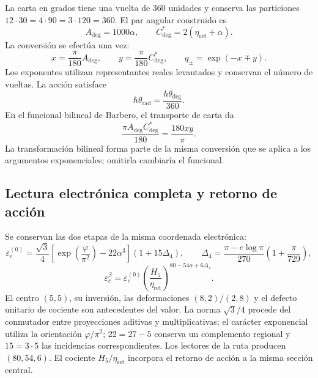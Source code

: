 La carta en grados tiene una vuelta de $360$ unidades y conserva las
particiones $12\cdot30=4\cdot90=3\cdot120=360$. El par angular construido es
\begin{equation}
 A_{\deg}=1000\alpha,
 \qquad C^*_{\deg}=2(\eta_{\mathrm{ret}}+\alpha).
 \label{md:compos:par-angular}
\end{equation}
La conversión se efectúa una vez:
\begin{equation}
 x=\frac{\pi}{180}A_{\deg},\qquad
 y=\frac{\pi}{180}C^*_{\deg},\qquad
 q_\pm=\exp(-x\mp y).
 \label{md:compos:canales}
\end{equation}
Los exponentes utilizan representantes reales levantados y conservan el
número de vueltas. La acción satisface
\begin{equation}
 \hbar\theta_{\mathrm{rad}}
 =\frac{h\theta_{\deg}}{360}.
 \label{md:compos:accion-cartas}
\end{equation}
En el funcional bilineal de Barbero, el transporte de carta da
\begin{equation}
 \frac{\pi A_{\deg}C^*_{\deg}}{180}
 =\frac{180xy}{\pi}.
 \label{md:compos:bilineal-cartas}
\end{equation}
La transformación bilineal forma parte de la misma conversión que se aplica
a los argumentos exponenciales; omitirla cambiaría el funcional.

\subsection{Lectura electrónica completa y retorno de acción}
\label{md:compos:electron}

Se conservan las dos etapas de la misma coordenada electrónica:
\begin{equation}
 \varepsilon_e^{(0)}=\frac{\sqrt{3}}{4}
 \left[\exp\!\left(\frac{\varphi}{\pi^2}\right)-22\alpha^3\right]
 (1+15\Delta_4),\qquad
 \Delta_4=\frac{\pi-e\log\pi}{270}
 \left(1+\frac{\pi}{729}\right),
 \label{md:compos:electron-basal}
\end{equation}
\begin{equation}
 \boxed{\varepsilon_e^\beta=\varepsilon_e^{(0)}
 \left(\frac{H_5}{\eta_{\mathrm{ret}}}\right)^{80-54\alpha+6\Delta_4}.}
 \label{md:compos:electron-completo}
\end{equation}
El centro $(5,5)$, su inversión, las deformaciones $(8,2)/(2,8)$ y el
defecto unitario de cociente son antecedentes del valor. La norma
$\sqrt{3}/4$ procede del conmutador entre proyecciones aditivas y
multiplicativas; el carácter exponencial utiliza la orientación
$\varphi/\pi^2$; $22=27-5$ conserva un complemento regional y $15=3\cdot5$
las incidencias correspondientes. Los lectores de la ruta producen
$(80,54,6)$. El cociente $H_5/\eta_{\mathrm{ret}}$ incorpora el retorno de
acción a la misma sección central.

